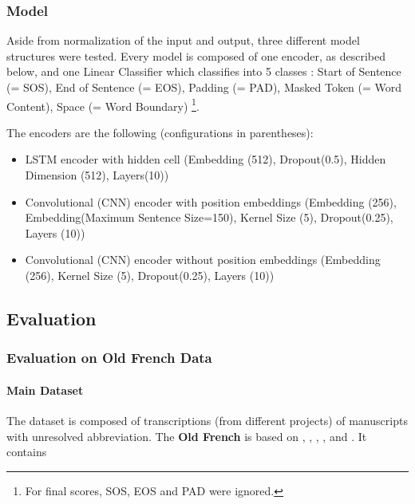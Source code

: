 \documentclass{jdmdh}
\begin{document}
\subsubsection{Model}

Aside from normalization of the input and output, three different model structures were tested. Every model is composed of one encoder, as described below, and one Linear Classifier which classifies into 5 classes : Start of Sentence (= SOS), End of Sentence (= EOS), Padding (= PAD), Masked Token (= Word Content), Space (= Word Boundary) \footnote{For final scores, SOS, EOS and PAD were ignored.}.

The encoders are the following (configurations in parentheses):

\begin{itemize}
  \item LSTM encoder with hidden cell (Embedding (512), Dropout(0.5), Hidden Dimension (512), Layers(10))
  \item Convolutional (CNN) encoder with position embeddings (Embedding (256), Embedding(Maximum Sentence Size=150), Kernel Size (5), Dropout(0.25), Layers (10))
  \item Convolutional (CNN) encoder without position embeddings (Embedding (256), Kernel Size (5), Dropout(0.25), Layers (10))
\end{itemize}

\subsection{Evaluation}


\subsubsection{Evaluation on Old French Data}

\paragraph{Main Dataset}

The dataset is composed of transcriptions (from different projects) of manuscripts with unresolved abbreviation. The \textbf{Old French} is based on \citet{8269990}, \citet{pinche:hal-01628533}, \citet{jean_baptiste_camps_2019_2630574}, \citet{bfmmss}, and \citet{tnah_transcription}. It contains
\end{document}
